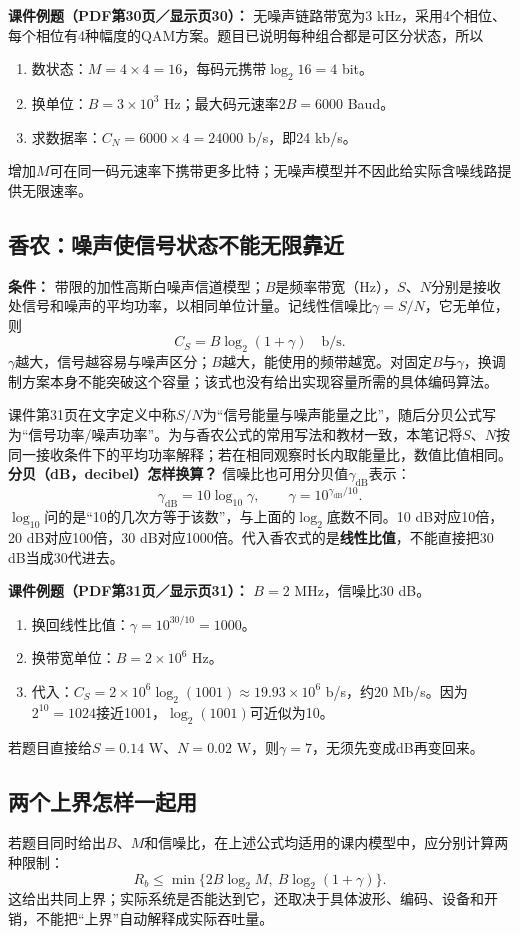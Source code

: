 \textbf{课件例题（PDF第30页／显示页30）：} 无噪声链路带宽为3 kHz，采用4个相位、每个相位有4种幅度的QAM方案。题目已说明每种组合都是可区分状态，所以
\begin{enumerate}
 \item 数状态：$M=4\times4=16$，每码元携带$\log_2 16=4$ bit。
 \item 换单位：$B=3\times10^3$ Hz；最大码元速率$2B=6000$ Baud。
 \item 求数据率：$C_N=6000\times4=24000$ b/s，即24 kb/s。
\end{enumerate}
增加$M$可在同一码元速率下携带更多比特；无噪声模型并不因此给实际含噪线路提供无限速率。
\annotationarea[4]

\subsection{香农：噪声使信号状态不能无限靠近}
\textbf{条件：} 带限的加性高斯白噪声信道模型；$B$是频率带宽（Hz），$S$、$N$分别是接收处信号和噪声的平均功率，以相同单位计量。记线性信噪比$\gamma=S/N$，它无单位，则
\[
 C_S=B\log_2(1+\gamma)\quad\text{b/s}.
\]
$\gamma$越大，信号越容易与噪声区分；$B$越大，能使用的频带越宽。对固定$B$与$\gamma$，换调制方案本身不能突破这个容量；该式也没有给出实现容量所需的具体编码算法。

课件第31页在文字定义中称$S/N$为“信号能量与噪声能量之比”，随后分贝公式写为“信号功率/噪声功率”。为与香农公式的常用写法和教材一致，本笔记将$S$、$N$按同一接收条件下的平均功率解释；若在相同观察时长内取能量比，数值比值相同。\textbf{分贝（dB，decibel）怎样换算？} 信噪比也可用分贝值$\gamma_{\mathrm{dB}}$表示：
\[
 \gamma_{\mathrm{dB}}=10\log_{10}\gamma,
 \qquad \gamma=10^{\gamma_{\mathrm{dB}}/10}.
\]
$\log_{10}$问的是“10的几次方等于该数”，与上面的$\log_2$底数不同。10 dB对应10倍，20 dB对应100倍，30 dB对应1000倍。代入香农式的是\textbf{线性比值}，不能直接把30 dB当成30代进去。

\textbf{课件例题（PDF第31页／显示页31）：} $B=2$ MHz，信噪比30 dB。
\begin{enumerate}
 \item 换回线性比值：$\gamma=10^{30/10}=1000$。
 \item 换带宽单位：$B=2\times10^6$ Hz。
 \item 代入：$C_S=2\times10^6\log_2(1001)\approx19.93\times10^6$ b/s，约20 Mb/s。因为$2^{10}=1024$接近1001，$\log_2(1001)$可近似为10。
\end{enumerate}
若题目直接给$S=0.14$ W、$N=0.02$ W，则$\gamma=7$，无须先变成dB再变回来。
\annotationarea[4]

\subsection{两个上界怎样一起用}
若题目同时给出$B$、$M$和信噪比，在上述公式均适用的课内模型中，应分别计算两种限制：
\[
 R_b\leq\min\{2B\log_2M,\ B\log_2(1+\gamma)\}.
\]
这给出共同上界；实际系统是否能达到它，还取决于具体波形、编码、设备和开销，不能把“上界”自动解释成实际吞吐量。

